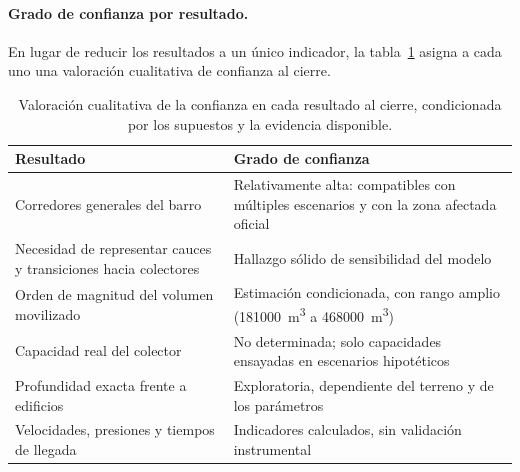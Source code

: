 \paragraph{Grado de confianza por resultado.} En lugar de reducir los resultados a un único indicador, la tabla~\ref{tab:confianza} asigna a cada uno una valoración cualitativa de confianza al cierre.
\begin{table}[htbp]\centering\small
\caption{Valoración cualitativa de la confianza en cada resultado al cierre, condicionada por los supuestos y la evidencia disponible.}\label{tab:confianza}
\begin{tabular}{p{}p{}}\toprule
Resultado & Grado de confianza\\\midrule
Corredores generales del barro & Relativamente alta: compatibles con múltiples escenarios y con la zona afectada oficial\\
Necesidad de representar cauces y transiciones hacia colectores & Hallazgo sólido de sensibilidad del modelo\\
Orden de magnitud del volumen movilizado & Estimación condicionada, con rango amplio (\SI{181000}{m^3} a \SI{468000}{m^3})\\
Capacidad real del colector & No determinada; solo capacidades ensayadas en escenarios hipotéticos\\
Profundidad exacta frente a edificios & Exploratoria, dependiente del terreno y de los parámetros\\
Velocidades, presiones y tiempos de llegada & Indicadores calculados, sin validación instrumental\\
\bottomrule\end{tabular}
\end{table}
